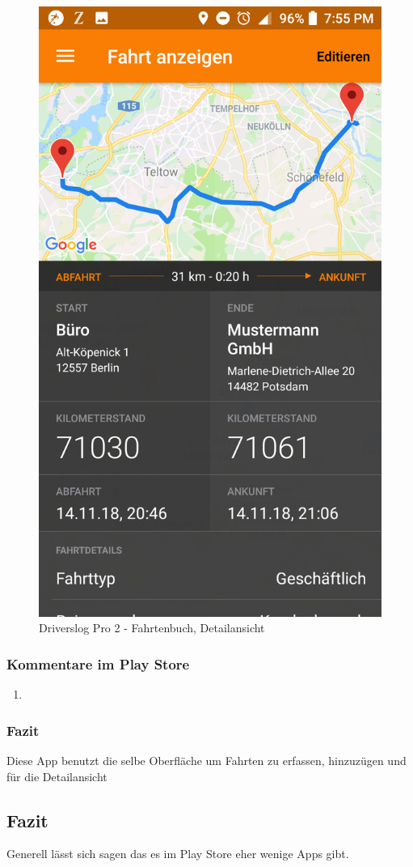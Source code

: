 \begin{figure}[!htp]
        \includegraphics[scale=0.12]{img/pro5}
        \caption{\label{img:img/pro5}Driverslog Pro 2 - Fahrtenbuch, Detailansicht}
\end{figure}


\subsubsection{Kommentare im Play Store}
\begin{enumerate}
    \item
\end{enumerate}

\subsubsection{Fazit}
Diese App benutzt die selbe Oberfläche um Fahrten zu erfassen, hinzuzügen und für die Detailansicht

\subsection{Fazit}
Generell lässt sich sagen das es im Play Store eher wenige Apps gibt.
